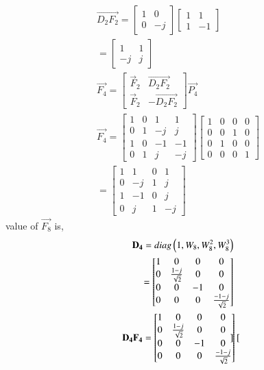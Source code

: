 \documentclass[journal,12pt,twocolumn]{IEEEtran}
\renewcommand\thesection{\arabic{section}}
\begin{document}
\begin{enumerate}[label=\arabic*.,ref=\thesection.\theenumi]
\begin{align}
		\vec{D_2F_2}=\begin{bmatrix}
			1&0\\0&-j
		\end{bmatrix}\begin{bmatrix}
			1&1\\1&-1
		\end{bmatrix}\\
		=\begin{bmatrix}
			1&1\\-j&j
		\end{bmatrix}\\
		\vec{F_4}=\begin{bmatrix}
			\vec{F}_{2} & \vec{D_2F_2} \\
			\vec{F}_{2} & -\vec{D_2F_2}
		\end{bmatrix}\vec{P_4}\\
		\vec{F_4}=\begin{bmatrix}
			1&0&1&1\\0&1&-j&j\\1&0&-1&-1\\0&1&j&-j
		\end{bmatrix}\begin{bmatrix}
			1&0&0&0\\0&0&1&0\\0&1&0&0\\0&0&0&1
		\end{bmatrix}\\
		=\begin{bmatrix}
			1&1&0&1\\0&-j&1&j\\1&-1&0&j\\0&j&1&-j
		\end{bmatrix}
	\end{align}
	value of $\vec{F_8}$ is,
	\begin{align}
		\mathbf{D_4}=diag\left(1,W_8,W_8^2,W_8^3\right)\\
		=\begin{bmatrix}
			1&0&0&0\\0&\frac{1-j}{\sqrt{2}}&0&0\\0&0&-1&0\\0&0&0&\frac{-1-j}{\sqrt{2}}
		\end{bmatrix}\\
		\mathbf{D_4F_4}=\begin{bmatrix}
			1&0&0&0\\0&\frac{1-j}{\sqrt{2}}&0&0\\0&0&-1&0\\0&0&0&\frac{-1-j}{\sqrt{2}}
		\end{bmatrix}\begin{bmatrix}

\end{bmatrix}
\end{align}
\end{enumerate}
\end{document}
